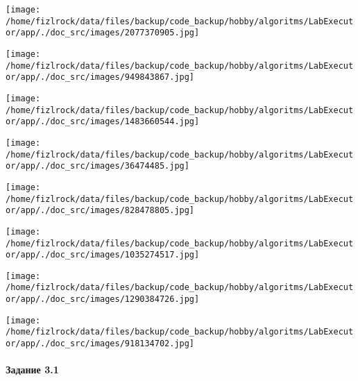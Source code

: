 \documentclass[a4paper, 12pt]{article}
\begin{document}
\texttt{[image: /home/fizlrock/data/files/backup/code\_backup/hobby/algoritms/LabExecutor/app/./doc\_src/images/2077370905.jpg]}

\texttt{[image: /home/fizlrock/data/files/backup/code\_backup/hobby/algoritms/LabExecutor/app/./doc\_src/images/949843867.jpg]}

\texttt{[image: /home/fizlrock/data/files/backup/code\_backup/hobby/algoritms/LabExecutor/app/./doc\_src/images/1483660544.jpg]}

\texttt{[image: /home/fizlrock/data/files/backup/code\_backup/hobby/algoritms/LabExecutor/app/./doc\_src/images/36474485.jpg]}

\texttt{[image: /home/fizlrock/data/files/backup/code\_backup/hobby/algoritms/LabExecutor/app/./doc\_src/images/828478805.jpg]}

\texttt{[image: /home/fizlrock/data/files/backup/code\_backup/hobby/algoritms/LabExecutor/app/./doc\_src/images/1035274517.jpg]}

\texttt{[image: /home/fizlrock/data/files/backup/code\_backup/hobby/algoritms/LabExecutor/app/./doc\_src/images/1290384726.jpg]}

\texttt{[image: /home/fizlrock/data/files/backup/code\_backup/hobby/algoritms/LabExecutor/app/./doc\_src/images/918134702.jpg]}
\pagebreak
\paragraph{Задание 3.1}
\end{document}
